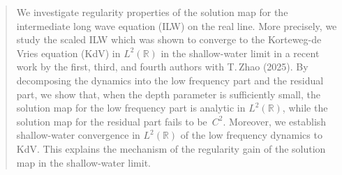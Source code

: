 \documentclass[letterpaper, 11pt,  reqno]{amsart}
\newcommand{\1}{\hspace{0.5mm}\textup{I}\hspace{0.5mm}}
\newcommand{\R}{\mathbb{R}}
\numberwithin{equation}{section}
\numberwithin{theorem}{section}
\begin{document}





\begin{abstract}
We investigate 
regularity properties of the solution map
for the intermediate long wave equation (ILW) on the real line.
More precisely, 
we study the scaled ILW 
which was shown to converge
to the Korteweg-de Vries equation (KdV)
in $L^2(\R)$
in the shallow-water limit
in a recent work by 
the first, third, and fourth authors with T.\,Zhao
(2025).
By decomposing the dynamics into 
the low frequency part and the residual part, 
we show that, when the depth parameter is sufficiently small,  
the solution map for the low frequency part
is analytic  in $L^2(\R)$, 
while the 
 solution map for the residual part fails to be~$C^2$.
Moreover, we establish
shallow-water convergence  in $L^2(\R)$
of  the low frequency dynamics
 to  KdV.
This explains the mechanism of  the regularity gain  of the solution map
in the shallow-water limit.





\end{abstract}






%
\maketitle
%



\tableofcontents
























\newpage
\end{document}
